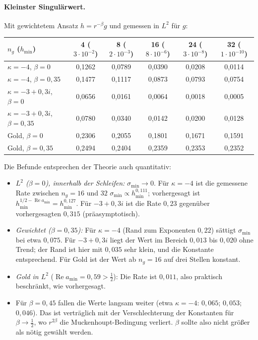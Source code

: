 \documentclass[11pt, a4paper]{article}
\theoremstyle{plain}
\theoremstyle{definition}
\begin{document}
\paragraph{Kleinster Singulärwert.} Mit gewichtetem Ansatz
$h=r^{-\beta}g$ und gemessen in $L^2$ für $g$:
\begin{center}\small
\begin{tabular}{lccccc}
\toprule
$n_g$ ($h_{\min}$) & 4 ($3\cdot10^{-2}$) & 8 ($2\cdot10^{-3}$) & 16 ($8\cdot10^{-6}$) & 24 ($3\cdot10^{-8}$) & 32 ($1\cdot10^{-10}$)\\
\midrule
$\kappa=-4$, $\beta=0$ & 0,1262 & 0,0789 & 0,0390 & 0,0208 & 0,0114\\
$\kappa=-4$, $\beta=0{,}35$ & 0,1477 & 0,1117 & 0,0873 & 0,0793 & 0,0754\\
$\kappa=-3+0{,}3i$, $\beta=0$ & 0,0656 & 0,0161 & 0,0064 & 0,0018 & 0,0005\\
$\kappa=-3+0{,}3i$, $\beta=0{,}35$ & 0,0780 & 0,0340 & 0,0142 & 0,0200 & 0,0128\\
Gold, $\beta=0$ & 0,2306 & 0,2055 & 0,1801 & 0,1671 & 0,1591\\
Gold, $\beta=0{,}35$ & 0,2494 & 0,2404 & 0,2359 & 0,2353 & 0,2352\\
\bottomrule
\end{tabular}
\end{center}

Die Befunde entsprechen der Theorie auch quantitativ:
\begin{itemize}[leftmargin=*]
  \item \emph{$L^2$ ($\beta=0$), innerhalb der Schleifen:} $\sigma_{\min}\to0$. Für
    $\kappa=-4$ ist die gemessene Rate zwischen $n_g=16$ und $32$
    $\sigma_{\min}\propto h_{\min}^{0{,}111}$; vorhergesagt ist
    $h_{\min}^{1/2-\operatorname{Re}a_{\min}} = h_{\min}^{0{,}127}$. Für $-3+0{,}3i$
    ist die Rate $0{,}23$ gegenüber vorhergesagten $0{,}315$ (präasymptotisch).
  \item \emph{Gewichtet ($\beta=0{,}35$):} Für $\kappa=-4$ (Rand zum Exponenten
    $0{,}22$) sättigt $\sigma_{\min}$ bei etwa $0{,}075$. Für $-3+0{,}3i$ liegt der
    Wert im Bereich $0{,}013$ bis $0{,}020$ ohne Trend; der Rand ist hier mit $0{,}035$
    sehr klein, und die Konstante entsprechend. Für Gold ist der Wert ab
    $n_g=16$ auf drei Stellen konstant.
  \item \emph{Gold in $L^2$} ($\operatorname{Re}a_{\min}=0{,}59>\tfrac12$): Die Rate
    ist $0{,}011$, also praktisch beschränkt, wie vorhergesagt.
  \item Für $\beta=0{,}45$ fallen die Werte langsam weiter (etwa $\kappa=-4$:
    $0{,}065$; $0{,}053$; $0{,}046$). Das ist verträglich mit der Verschlechterung der
    Konstanten für $\beta\to\tfrac12$, wo $r^{2\beta}$ die Muckenhoupt-Bedingung
    verliert. $\beta$ sollte also nicht größer als nötig gewählt werden.
\end{itemize}
\end{document}
